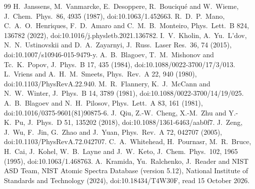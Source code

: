 \documentclass[11pt]{article}
\begin{document}
\begin{thebibliography}{99}
 H.~Janssens, M.~Vanmarcke, E.~Desoppere, R.~Bouciqu\'e and W.~Wieme, J.\ Chem.\ Phys.\ 86, 4935 (1987), doi:10.1063/1.452663.
 R.~D.~P.~Mano, C.~A.~O.~Henriques, F.~D.~Amaro and C.~M.~B.~Monteiro, Phys.\ Lett.\ B 824, 136782 (2022), doi:10.1016/j.physletb.2021.136782.
 I.~V.~Kholin, A.~Yu.~L'dov, N.~N.~Ustinovskii and D.~A.~Zayarnyi, J.\ Russ.\ Laser Res.\ 36, 74 (2015), doi:10.1007/s10946-015-9479-y.
 A.~B.~Blagoev, T.~M.~Mishonov and Tc.~K.~Popov, J.\ Phys.\ B 17, 435 (1984), doi:10.1088/0022-3700/17/3/013.
 L.~Vriens and A.~H.~M.~Smeets, Phys.\ Rev.\ A 22, 940 (1980), doi:10.1103/PhysRevA.22.940.
 M.~R.~Flannery, K.~J.~McCann and N.~W.~Winter, J.\ Phys.\ B 14, 3789 (1981), doi:10.1088/0022-3700/14/19/025.
 A.~B.~Blagoev and N.~H.~Pilosov, Phys.\ Lett.\ A 83, 161 (1981), doi:10.1016/0375-9601(81)90875-6.
 J.~Qiu, Z.-W.~Cheng, X.-M.~Zhu and Y.-K.~Pu, J.\ Phys.\ D 51, 135202 (2018), doi:10.1088/1361-6463/aab0f7.
 J.~Zeng, J.~Wu, F.~Jin, G.~Zhao and J.~Yuan, Phys.\ Rev.\ A 72, 042707 (2005), doi:10.1103/PhysRevA.72.042707.
 C.~A.~Whitehead, H.~Pournasr, M.~R.~Bruce, H.~Cai, J.~Kohel, W.~B.~Layne and J.~W.~Keto, J.\ Chem.\ Phys.\ 102, 1965 (1995), doi:10.1063/1.468763.
 A.~Kramida, Yu.~Ralchenko, J.~Reader and NIST ASD Team, NIST Atomic Spectra Database (version 5.12), National Institute of Standards and Technology (2024), doi:10.18434/T4W30F, read 15 October 2026.
\end{thebibliography}
\end{document}
